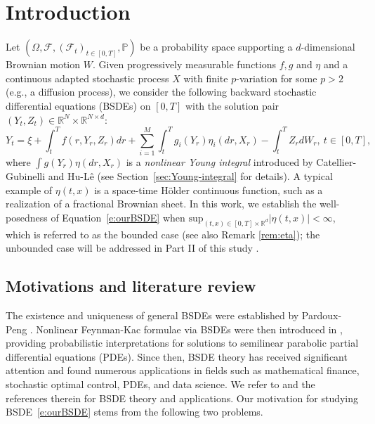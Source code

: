 \documentclass[11pt,reqno]{amsart}
\def\R{\mathbb R}
\numberwithin{equation}{section}
\begin{document}
\section{Introduction}
Let $(\Omega, \mathcal F, (\mathcal F_t)_{t\in[0,T]}, \mathbb{P})$ be a probability space
supporting a  $d$-dimensional Brownian motion $W$. Given progressively measurable functions $f,g$ and $\eta$ and a  continuous adapted stochastic process $X$ with finite $p$-variation for some $p>2$ (e.g., a diffusion process), we consider the following backward stochastic differential equations (BSDEs) on $[0,T]$ with the solution pair $(Y_t,Z_t)\in \R^N\times \R^{N\times d}$:
\begin{equation}\label{e:ourBSDE}
Y_{t} = \xi + \int_{t}^{T}f(r,Y_{r},Z_{r})dr + \sum_{i=1}^{M}\int_{t}^{T}g_{i}(Y_{r})\eta_{i}(dr,X_{r}) - \int_{t}^{T}Z_{r}dW_{r},\ t\in[0,T],
\end{equation}
where  $\int g(Y_r) \eta(dr,X_{r})$ is a {\it nonlinear Young integral} introduced by Catellier-Gubinelli \cite{Catellier-Gubinelli-2016} and Hu-L\^e \cite{HuLe} (see Section~\ref{sec:Young-integral} for details). A typical example of $\eta(t,x)$ is a space-time H\"older continuous function, such as a realization of a fractional Brownian sheet. In this work, we establish the well-posedness of Equation~\eqref{e:ourBSDE} when $\text{sup}_{(t,x)\in [0,T]\times \R^d} |\eta(t,x)| <\infty$, which is referred to as the bounded case (see also Remark \ref{rem:eta}); the unbounded case will be addressed in Part II of this study \cite{BSDEYoung-II}.
 
\subsection{Motivations and literature review}\label{sec:background}
The existence and uniqueness of general BSDEs were established by Pardoux-Peng \cite{PardouxPeng1990}. Nonlinear Feynman-Kac formulae via BSDEs were then introduced in \cite{Peng-1991,pp92}, providing probabilistic interpretations for solutions to semilinear parabolic partial differential equations (PDEs). Since then, BSDE theory has received significant attention and found numerous applications in fields such as mathematical finance, stochastic optimal control,  PDEs, and data science.  We refer to \cite{ElKaroui1997, zhang2017backward} and the references therein for BSDE theory and applications. Our motivation for studying BSDE~\eqref{e:ourBSDE} stems from the following two problems. \\
\end{document}

